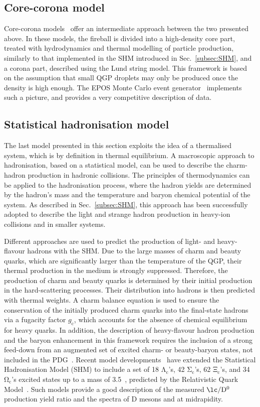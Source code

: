 \subsection{Core-corona model}
Core-corona models~\cite{Werner:2007bf} offer an intermediate approach between the two presented above. In these models, the fireball is divided into a high-density core part, treated with hydrodynamics and thermal modelling of particle production, similarly to that implemented in the SHM introduced in Sec.~\ref{subsec:SHM}, and a corona part, described using the Lund string model. This framework is based on the assumption that small QGP droplets may only be produced once the density is high enough. The EPOS Monte Carlo event generator~\cite{Porteboeuf:2008fgf} implements such a picture, and provides a very competitive description of data.

\subsection{Statistical hadronisation model}
The last model presented in this section exploits the idea of a thermalised system, which is by definition in thermal equilibrium. A macroscopic approach to hadronisation, based on a statistical model, can be used to describe the charm-hadron production in hadronic collisions. The principles of thermodynamics can be applied to the hadronisation process, where the hadron yields are determined by the hadron's mass and the temperature and baryon chemical potential of the system. As described in Sec.~\ref{subsec:SHM}, this approach has been successfully adopted to describe the light and strange hadron production in heavy-ion collisions and in smaller systems. 

Different approaches are used to predict the production of light- and heavy-flavour hadrons with the SHM. Due to the large masses of charm and beauty quarks, which are significantly larger than the temperature of the QGP, their thermal production in the medium is strongly suppressed. Therefore, the production of charm and beauty quarks is determined by their initial production in the hard-scattering processes. Their distribution into hadrons is then predicted with thermal weights. A charm balance equation is used to ensure the conservation of the initially produced charm quarks into the final-state hadrons via a fugacity factor $g_\mathrm{c}$, which accounts for the absence of chemical equilibrium for heavy quarks. In addition, the description of heavy-flavour hadron production and the baryon enhancement in this framework requires the inclusion of a strong feed-down from an augmented set of excited charm- or beauty-baryon states, not included in the PDG~\cite{pdg}. Recent model developments~\cite{He:2019tik,He:2022tod} have extended the Statistical Hadronisation Model (SHM) to include a set of 18 $\mathrm{\Lambda_c}$'s, 42 $\mathrm{\Sigma_c}$'s, 62 $\mathrm{\Xi_c}$'s, and 34 $\mathrm{\Omega_c}$'s excited states up to a mass of 3.5~\gev, predicted by the Relativistic Quark Model~\cite{Ebert:2011kk}. Such models provide a good description of the measured $\mathrm{\lc/D^0}$ production yield ratio and the \pt spectra of D mesons and \lc at midrapidity.

